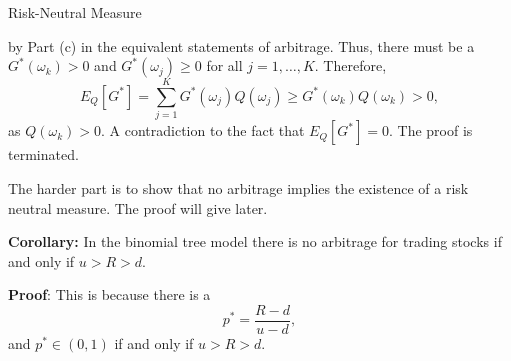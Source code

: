 \documentclass{beamer}
\begin{document}
\begin{frame}{Risk-Neutral Measure}

    {\footnotesize \footnotesize
    by Part (c) in the equivalent statements of arbitrage. Thus, there must be a $G^*(\omega_k) > 0$ and $G^*(\omega_j) \geq 0$ for all $j = 1, \ldots, K$. Therefore,
\[
E_Q[G^*] = \sum_{j=1}^K G^*(\omega_j) Q(\omega_j) \geq G^*(\omega_k) Q(\omega_k) > 0,
\]
as $Q(\omega_k) > 0$. A contradiction to the fact that $E_Q[G^*] = 0$. The proof is terminated.

The harder part is to show that no arbitrage 
implies the existence of a risk neutral measure. The proof will give later.
\vspace{1em}

\par \textbf{Corollary:} In the binomial tree model there is no arbitrage 
for trading stocks if and only if $u > R > d$.
\vspace{1em}
\par \textbf{Proof}: This is because there is a
\[
p^* = \frac{R - d}{u - d},
\]
and $p^* \in (0, 1)$ if and only if $u > R > d$.
    }
\end{frame}
\end{document}
